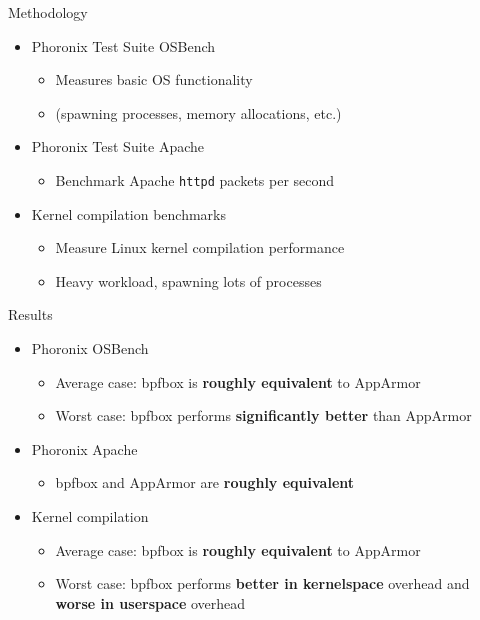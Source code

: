 \documentclass[12pt, dvipsnames]{beamer}
\begin{document}
\begin{frame}[c]{Methodology}
\begin{itemize}
    \item Phoronix Test Suite OSBench
    \begin{itemize}
        \item Measures basic OS functionality
        \item (spawning processes, memory allocations, etc.)
    \end{itemize}

    \vfill
    \item Phoronix Test Suite Apache
    \begin{itemize}
        \item Benchmark Apache \texttt{httpd} packets per second
    \end{itemize}

    \vfill
    \item Kernel compilation benchmarks
    \begin{itemize}
        \item Measure Linux kernel compilation performance
        \item Heavy workload, spawning lots of processes
    \end{itemize}
\end{itemize}
\end{frame}

\begin{frame}[c]{Results}
\begin{itemize}
    \item Phoronix OSBench
    \begin{itemize}
        \item Average case: bpfbox is \textbf{roughly equivalent} to AppArmor
        \item Worst case: bpfbox performs \textbf{significantly better} than AppArmor
    \end{itemize}

    \vfill
    \item Phoronix Apache
    \begin{itemize}
        \item bpfbox and AppArmor are \textbf{roughly equivalent}
    \end{itemize}

    \vfill
    \item Kernel compilation
    \begin{itemize}
        \item Average case: bpfbox is \textbf{roughly equivalent} to AppArmor
        \item Worst case: bpfbox performs \textbf{better in kernelspace} overhead and \textbf{worse in userspace} overhead
    \end{itemize}
\end{itemize}
\end{frame}
\end{document}
